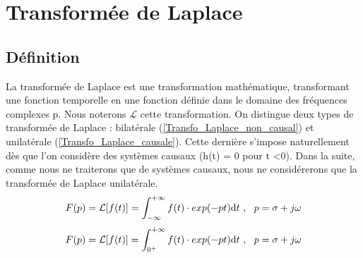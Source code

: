 \documentclass[]{book}
\begin{document}
{	\section{Transformée de Laplace}
	\subsection{Définition}
	La transformée de Laplace est une transformation mathématique, transformant une fonction temporelle en une fonction définie dans le domaine des fréquences complexes p. Nous noterons $\mathcal{L}$ cette transformation. On distingue deux types de transformée de Laplace : bilatérale (\ref{Transfo_Laplace_non_causal}) et unilatérale (\ref{Transfo_Laplace_causale}). Cette dernière s'impose naturellement dès que l'on considère des systèmes causaux (h(t) = 0 pour t <0). Dans la suite, comme nous ne traiterons que de systèmes causaux, nous ne considérerons que la transformée de Laplace unilatérale.
	\begin{equation}\label{Transfo_Laplace_non_causale}
	F(p) = \mathcal{L}[f(t)] = \int_{-\infty}^{+\infty} f(t) \cdot exp(-pt)	\mathrm{d} t~,~~p=\sigma + j \omega	
	\end{equation}
	\begin{equation}\label{Transfo_Laplace_causale}
	F(p) = \mathcal{L}[f(t)] = \int_{0^{+}}^{+\infty} f(t) \cdot exp(-pt)	\mathrm{d} t~,~~p=\sigma + j \omega	
	\end{equation}

	
}
\end{document}
